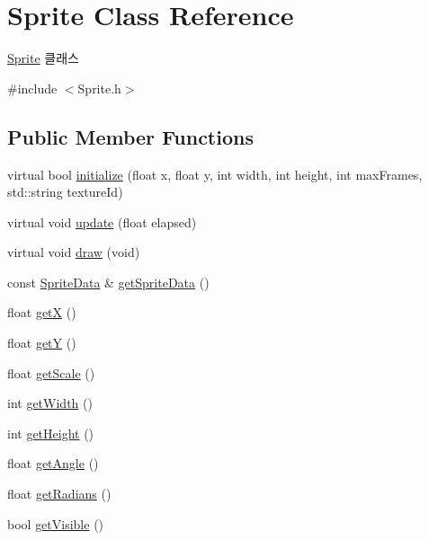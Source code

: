\hypertarget{class_sprite}{}\section{Sprite Class Reference}
\label{class_sprite}


\mbox{\hyperlink{class_sprite}{Sprite}} 클래스  




{\ttfamily \#include $<$Sprite.\+h$>$}

\subsection*{Public Member Functions}
\begin{DoxyCompactItemize}
\item 
virtual bool \mbox{\hyperlink{class_sprite_aba9774f26aa07337d9e071b9e436dd95}{initialize}} (float x, float y, int width, int height, int max\+Frames, std\+::string texture\+Id)
\item 
virtual void \mbox{\hyperlink{class_sprite_a8552f93511e6f0957c7f763104193afb}{update}} (float elapsed)
\item 
virtual void \mbox{\hyperlink{class_sprite_a940292edd2ff28d2e8c60b840636f994}{draw}} (void)
\item 
const \mbox{\hyperlink{struct_sprite_data}{Sprite\+Data}} \& \mbox{\hyperlink{class_sprite_afce7986c5fb568479b044a36f4c1cbbf}{get\+Sprite\+Data}} ()
\item 
float \mbox{\hyperlink{class_sprite_a566efc9772b4e9a983d3db71b2e5e34e}{getX}} ()
\item 
float \mbox{\hyperlink{class_sprite_a3bb08547e9d46ab58e05aec774b26ee4}{getY}} ()
\item 
float \mbox{\hyperlink{class_sprite_a1b0aff3c4f856f0c8cf56df3d81bc7ef}{get\+Scale}} ()
\item 
int \mbox{\hyperlink{class_sprite_aba3d4752461ec679fbf5de7ec4c34f61}{get\+Width}} ()
\item 
int \mbox{\hyperlink{class_sprite_a67b67082cfda90103d2d9eefea04cc4b}{get\+Height}} ()
\item 
float \mbox{\hyperlink{class_sprite_a9c887ea9c0c44f7bc0ca9746e885ed31}{get\+Angle}} ()
\item 
float \mbox{\hyperlink{class_sprite_a1b6ffa95774ad477b746d49ac366b5a6}{get\+Radians}} ()
\item 
bool \mbox{\hyperlink{class_sprite_a0dccd1488bcdba09fc67d1d4bb19298f}{get\+Visible}} ()
\item 

\end{DoxyCompactItemize}
